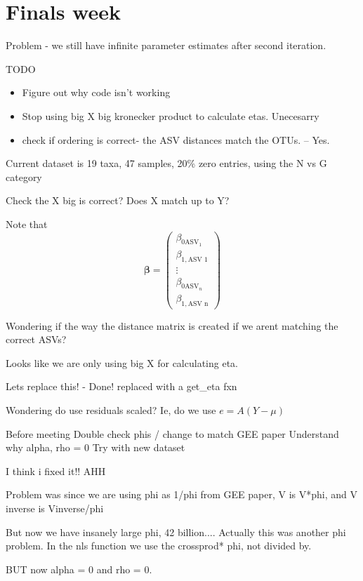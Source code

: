 \documentclass[10pt]{article}
\begin{document}
\section{Finals week}

Problem - we still have infinite parameter estimates after second iteration.


TODO
\begin{itemize}
  \item Figure out why code isn't working


  \item Stop using big X big kronecker product to calculate etas. Unecesarry
  \item check if ordering is correct- the ASV distances match the OTUs. -- Yes.
\end{itemize}

Current dataset is 19 taxa, 47 samples, 20\% zero entries, using the N vs G category


Check the X big is correct? Does X match up to Y?

Note that
\[\boldsymbol\beta = \begin{pmatrix}\beta_{0\text{ASV}_1} \\ \beta_{1, \text{ASV 1}} \\ \vdots \\ \beta_{0\text{ASV}_n} \\ \beta_{1, \text{ASV n}}\end{pmatrix} \]


Wondering if the way the distance matrix is created if we arent matching the correct ASVs?



Looks like we are only using big X for calculating eta.

Lets replace this! - Done! replaced with a get\_eta fxn


Wondering do use residuals scaled?
Ie, do we use $e = A (Y - \mu)$

Before meeting
Double check phis / change to match GEE paper
Understand why alpha, rho = 0
Try with new dataset

I think i fixed it!! AHH

Problem was since we are using phi as 1/phi from GEE paper, V is V*phi, and V inverse is Vinverse/phi

But now we have insanely large phi, 42 billion....
Actually this was another phi problem. In the nls function we use the crossprod* phi, not divided by.

BUT now alpha = 0 and rho = 0.
\end{document}
